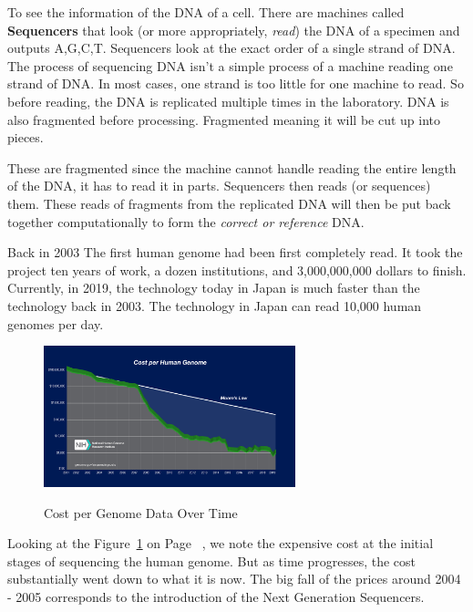 \documentclass{article}
\begin{document}
To see the information of the DNA of a cell. There are machines called \textbf{Sequencers} that look (or more appropriately, \textit{read}) the DNA of a specimen and outputs A,G,C,T. Sequencers look at the exact order of a single strand of DNA. The process of sequencing DNA isn't a simple process of a machine reading one strand of DNA. In most cases, one strand is too little for one machine to read. So before reading, the DNA is replicated multiple times in the laboratory. DNA is also fragmented before processing. Fragmented meaning it will be cut up into pieces.


These are fragmented since the machine cannot handle reading the entire length of the DNA, it has to read it in parts. Sequencers then reads (or sequences) them.  These reads of fragments from the replicated DNA will then be put back together computationally to form the \textit{correct or reference} DNA.



Back in 2003 The first human genome \autocite{introgenomics} had been first completely read. It took the project ten years of work, a dozen institutions, and 3,000,000,000 dollars to finish. Currently, in 2019, the technology today in Japan is much faster than the technology back in 2003. The technology in Japan can read 10,000 human genomes per day. \autocite[p.~19]{introgenomics} 



\begin{figure}[h]
\caption{Cost per Genome Data Over Time}
\centering
\includegraphics[width=0.65\textwidth]{images/human-gen-cost.jpg} 
\label{fig:human_gen_cost_fig}
\end{figure}

Looking at the Figure~\ref{fig:human_gen_cost_fig} on Page~\pageref{fig:human_gen_cost_fig} \autocite{genomics-cost}, we note the expensive cost at the initial stages of sequencing the human genome. But as time progresses, the cost substantially went down to what it is now. The big fall of the prices around 2004 - 2005 corresponds to the introduction of the Next Generation Sequencers.
\end{document}
